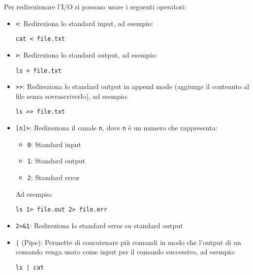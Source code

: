 \documentclass[a4paper]{article}
\begin{document}
\vspace{1em}
\noindent
Per redirezionare l'I/O si possono usare i seguenti operatori:
\begin{itemize}
  \item \texttt{<}: Redireziona lo standard input, ad esempio:
\begin{lstlisting}
cat < file.txt
\end{lstlisting}

  \item \texttt{>}: Redireziona lo standard output, ad esempio:
\begin{lstlisting}
ls > file.txt
\end{lstlisting}

  \item \texttt{>>}: Redireziona lo standard output in append mode (aggiunge il contenuto
    al file senza sovrascriverlo), ad esempio:
\begin{lstlisting}
ls >> file.txt
\end{lstlisting}

\item \texttt{[n]>}: Redireziona il canale \texttt{n}, dove \texttt{n} è un numero
  che rappresenta:
  \begin{itemize}
    \item \texttt{0}: Standard input
    \item \texttt{1}: Standard output
    \item \texttt{2}: Standard error
  \end{itemize}
  Ad esempio:
\begin{lstlisting}
ls 1> file.out 2> file.err
\end{lstlisting}

  \item \texttt{2>\&1}: Redireziona lo standard error su standard output

  \item \texttt{|} (Pipe): Permette di concatenare più comandi in modo che l'output di
    un comando venga usato come input per il comando successivo, ad esempio:
\begin{lstlisting}
ls | cat
\end{lstlisting}
\end{itemize}
\end{document}
